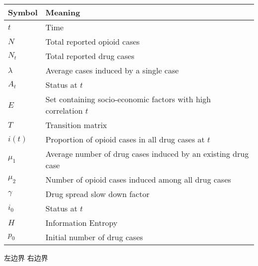 \documentclass{ctexart}
\begin{document}
    \begin{table}[h]
        \centering
        \setlength{\leftskip}{0pt plus 1fil minus \marginparwidth}
        \setlength{\rightskip}{\leftskip}%
        \vspace{3pt}
        \begin{tabular}{>{\centering\arraybackslash}p{5em}>{\centering\arraybackslash}p{30em}}
        \toprule %
        Symbol & Meaning \\ \midrule
        $t$ & Time \\
        $N$ & Total reported opioid cases\\
        $N_t$ & Total reported drug cases\\
        $\lambda$ & Average cases induced by a single case\\
        $A_t$ & Status at $t$ \\ 
        $E$ & Set containing socio-economic factors with high correlation $t$ \\
        $T$ & Transition matrix\\ 
        $i(t)$ & Proportion of opioid cases in all drug cases at $t$ \\
        $\mu_1$ & Average number of drug cases induced by an existing drug case \\
        $\mu_2$ & Number of opioid cases induced among all drug cases \\
        $\gamma$ & Drug spread slow down factor \\
        $i_0$ & Status at $t$ \\ 
        $H$ & Information Entropy \\ 
        $p_0$ & Initial number of drug cases\\
        
        \bottomrule
        \end{tabular}
    \end{table}

    \newpage
    \noindent 左边界 
    \hfill 右边界 %
\end{document}
